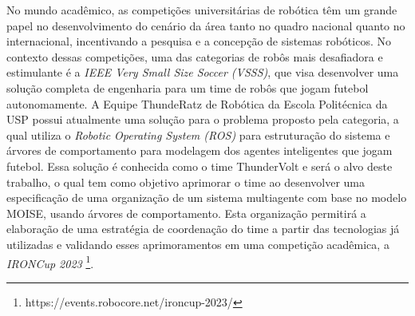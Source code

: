 No mundo acadêmico, as competições universitárias de robótica têm um grande papel no desenvolvimento do cenário da área tanto no quadro nacional quanto no internacional, incentivando a pesquisa e a concepção de sistemas robóticos. No contexto dessas competições, uma das categorias de robôs mais desafiadora e estimulante é a \textit{IEEE Very Small Size Soccer (VSSS)}, que visa desenvolver uma solução completa de engenharia para um time de robôs que jogam futebol autonomamente. A Equipe ThundeRatz de Robótica da Escola Politécnica da USP possui atualmente uma solução para o problema proposto pela categoria, a qual utiliza o \textit{Robotic Operating System (ROS)} para estruturação do sistema e árvores de comportamento para modelagem dos agentes inteligentes que jogam futebol. Essa solução é conhecida como o time ThunderVolt e será o alvo deste trabalho, o qual tem como objetivo aprimorar o time ao desenvolver uma especificação de uma organização de um sistema multiagente com base no modelo MOISE, usando árvores de comportamento. Esta organização permitirá a elaboração de uma estratégia de coordenação do time a partir das tecnologias já utilizadas e validando esses aprimoramentos em uma competição acadêmica, a \textit{IRONCup 2023} \footnote{https://events.robocore.net/ironcup-2023/}.